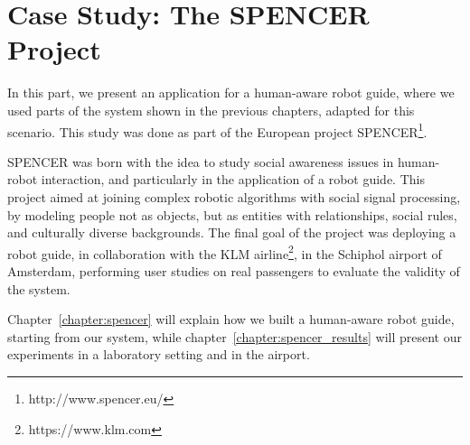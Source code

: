 \part{Case Study: The SPENCER Project} %

\label{part:case_study} %


In this part, we present an application for a human-aware robot guide, where we used parts of the system shown in the previous chapters, adapted for this scenario. This study was done as part of the European project SPENCER\footnote{http://www.spencer.eu/}.

 SPENCER  was born with the idea to study social awareness issues in human-robot interaction, and particularly in the application of a robot guide. This project aimed at joining complex robotic algorithms  with social signal processing, by modeling people not as objects, but as entities with relationships, social rules, and culturally diverse backgrounds. The final goal of the project was deploying a robot guide, in collaboration with the KLM airline\footnote{https://www.klm.com}, in the Schiphol airport of Amsterdam, performing user studies on real passengers to evaluate the validity of the system.

Chapter~\ref{chapter:spencer} will explain how we built a human-aware robot guide, starting from our system, while chapter~\ref{chapter:spencer_results} will present our experiments in a laboratory setting and in the airport.


 
 
